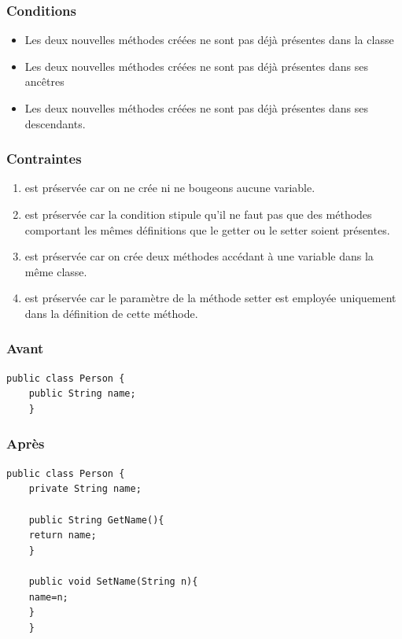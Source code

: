 \documentclass[a4paper, 12pt]{article}
\begin{document}
  \subsubsection{Conditions}

  \begin{itemize}[label=\textbullet]
    \item Les deux nouvelles méthodes créées ne sont pas déjà présentes dans la classe
    \item Les deux nouvelles méthodes créées ne sont pas déjà présentes dans ses ancêtres
    \item Les deux nouvelles méthodes créées ne sont pas déjà présentes dans ses descendants.
  \end{itemize}

  \subsubsection{Contraintes}

  \begin{enumerate}
    \item est préservée car on ne crée ni ne bougeons aucune variable.
    \item est préservée car la condition stipule qu'il ne faut pas que des méthodes comportant les mêmes définitions que le getter ou le setter soient présentes.
    \item est préservée car on crée deux méthodes accédant à une variable dans la même classe.
    \item est préservée car le paramètre de la méthode setter est employée uniquement dans la définition de cette méthode.
  \end{enumerate}

  \subsubsection{Avant}

  \begin{lstlisting}[frame=single]
    public class Person {
    public String name;
    }
  \end{lstlisting}

  \subsubsection{Après}

  \begin{lstlisting}[frame=single]
    public class Person {
    private String name;

    public String GetName(){
    return name;
    }

    public void SetName(String n){
    name=n;
    }
    }
  \end{lstlisting}
\end{document}
